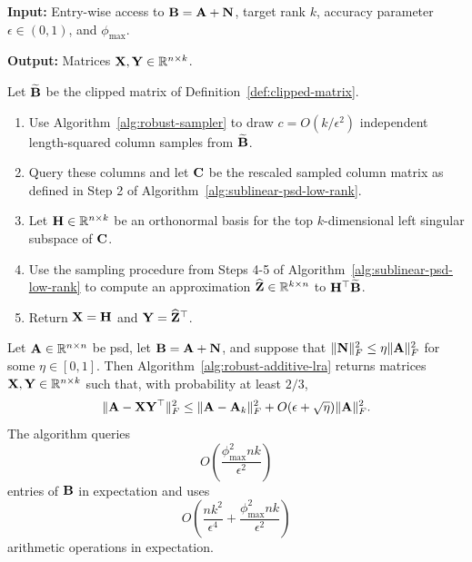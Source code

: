 \begin{algorithm}[H]
\caption{Robust Additive-Error Low-Rank Approximation}
\label{alg:robust-additive-lra}

\noindent
\textbf{Input:} Entry-wise access to \(\mathbf{B}=\mathbf{A}+\mathbf{N}\), target rank \(k\),
accuracy parameter \(\epsilon\in(0,1)\), and \(\phi_{\max}\).

\smallskip
\noindent
\textbf{Output:} Matrices \(\mathbf{X},\mathbf{Y}\in\mathbb{R}^{n\times k}\).

\smallskip
\noindent
Let \(\widetilde{\mathbf{B}}\) be the clipped matrix of
Definition~\ref{def:clipped-matrix}.

\begin{enumerate}[
    label=\arabic*.,
    leftmargin=2em,
    itemsep=0.35em,
    topsep=0.45em,
    parsep=0pt
]
    \item Use Algorithm~\ref{alg:robust-sampler} to draw
    \(c=O(k/\epsilon^2)\) independent length-squared column samples from
    \(\widetilde{\mathbf{B}}\). 
    
    \item Query these columns and let \(\mathbf{C}\) be the rescaled sampled column matrix as defined in Step 2 of Algorithm~\ref{alg:sublinear-psd-low-rank}.

    \item Let \(\mathbf{H}\in\mathbb{R}^{n\times k}\) be an orthonormal basis for the top
    \(k\)-dimensional left singular subspace of \(\mathbf{C}\).

    \item Use the sampling procedure from Steps 4-5 of
    Algorithm~\ref{alg:sublinear-psd-low-rank} to compute an approximation
    \(\widehat{\mathbf{Z}}\in\mathbb{R}^{k\times n}\) to \(\mathbf{H}^\top\widetilde{\mathbf{B}}\).

    \item Return \(\mathbf{X}=\mathbf{H}\) and \(\mathbf{Y}=\widehat{\mathbf{Z}}^{\top}\).
\end{enumerate}
\end{algorithm}

\begin{theorem}
\label{thm:robust-additive-lra}
Let \(\mathbf{A}\in\mathbb{R}^{n\times n}\) be psd, let \(\mathbf{B}=\mathbf{A}+\mathbf{N}\), and suppose that
\(
    \|\mathbf{N}\|_F^2 \leq \eta\|\mathbf{A}\|_F^2
\)
for some \(\eta\in[0,1]\). Then Algorithm~\ref{alg:robust-additive-lra}
returns matrices \(\mathbf{X},\mathbf{Y}\in\mathbb{R}^{n\times k}\) such that, with probability at
least \(2/3\),
\[
    \|\mathbf{A}-\mathbf{X}\mathbf{Y}^\top\|_F^2
    \leq
    \|\mathbf{A}-\mathbf{A}_k\|_F^2
    +
    O(\epsilon+\sqrt{\eta})\|\mathbf{A}\|_F^2.
\]
The algorithm queries
\[
    O\left(\frac{\phi_{\max}^2 n k}{\epsilon^2}\right)
\]
entries of \(\mathbf{B}\) in expectation and uses
\[
    O\left(
        \frac{n k^2}{\epsilon^4}
        +
        \frac{\phi_{\max}^2 n k}{\epsilon^2}
    \right)
\]
arithmetic operations in expectation.
\end{theorem}

